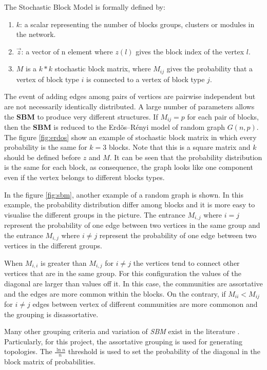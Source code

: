 The Stochastic Block Model is formally defined by: 
\begin{enumerate}

    \item $k$: a scalar representing the number of blocks groups, clusters or modules in the network.
    \item $\overrightarrow{z}$: a vector of n element where $z(l)$ gives the block index of the vertex $l$.
    \item $M$ is a $k * k$ stochastic block matrix, where $M_{ij}$ gives the probability that a vertex of block type $i$ is connected to a vertex of block type $j$.
\end{enumerate}


The event of adding edges among pairs of vertices are pairwise independent but are not necessarily identically distributed. A large number of parameters allows the \textbf{SBM} to produce very different structures. If $M_{ij} = p$ for each pair of blocks, then the \textbf{SBM} is reduced to the Erd\~os--R\'enyi model of random graph $G(n,p)$. The figure \ref{fig:erdos} show an example of stochastic block matrix in which every probability is the same for $k = 3$ blocks. Note that this is a square matrix and $k$ should be defined before $z$ and $M$. It can be seen that the probability distribution is the same for each block, as consequence, the graph looks like one component even if the vertex belongs to different blocks types.

 In the figure \ref{fig:sbm}, another example of a random graph is shown. In this example, the probability distribution differ among blocks and it is more easy to visualise the different groups in the picture. The entrance $M_{i,j}$ where $i = j$ represent the probability of one edge between two vertices in the same group and the entrance $M_{i,j}$ where $i \neq j$ represent the probability of one edge between two vertices in the different groups. 

When $M_{i,i}$ is greater than $M_{i,j}$ for $i \neq j$ the vertices tend to connect other vertices that are in the same group. For this configuration the values of the diagonal are larger than values off it. In this case, the communities are assortative and the edges are more common within the blocks. On the contrary, if $M_{ii} <  M_{ij}$ for $i \neq j$ edges between vertex of different communities are more commonon and the grouping is disassortative.


Many other grouping criteria and variation of \textit{SBM} exist in the literature \cite{carrington2005models,holland1983stochastic,airoldi2008mixed}. Particularly, for this project, the assortative grouping is used for generating topologies. The ${\tfrac {\ln n}{n}}$ threshold is used to set the probability of the diagonal in the block matrix of probabilities. 

